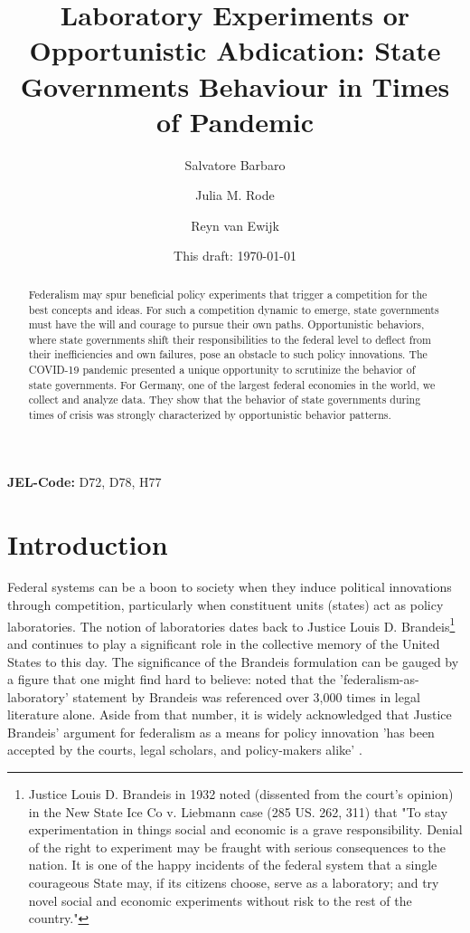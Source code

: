 \documentclass[12pt, abstracton]{scrartcl}
\title{Laboratory Experiments or Opportunistic Abdication: State Governments Behaviour in Times of Pandemic}
\author[$\star$]{Salvatore Barbaro}
\author[$\mp$]{Julia M. Rode}
\author[$ \dag$]{Reyn van Ewijk}
\affil[$\star$,$\dag$]{Johannes-Gutenberg University, Gutenberg School of Management and Economics and Interdisciplinary Public Policy \\ 55122 Mainz, Germany \href{mailto:sbarbaro@uni-mainz.de}{sbarbaro@uni-mainz.de}}
\affil[$\mp$]{Deutsche Bundesbank, 60431 Frankfurt (HE), Germany}
\date{This draft: \today}
\begin{document}
\maketitle

\begin{abstract}
Federalism may spur beneficial policy experiments that trigger a competition for the best concepts and ideas. For such a competition dynamic to emerge, state governments must have the will and courage to pursue their own paths. Opportunistic behaviors, where state governments shift their responsibilities to the federal level to deflect from their inefficiencies and own failures, pose an obstacle to such policy innovations. The COVID-19 pandemic presented a unique opportunity to scrutinize the behavior of state governments. For Germany, one of the largest federal economies in the world, we collect and analyze data. They show that the behavior of state governments during times of crisis was strongly characterized by opportunistic behavior patterns.
\end{abstract}

\textbf{JEL-Code:} D72, D78,  H77
\linenumbers
\section[Introduction]{Introduction}\label{sec.introduction}
Federal systems can be a boon to society when they induce political innovations through competition, particularly when constituent units (states) act as policy laboratories. The notion of laboratories dates back to Justice Louis D. Brandeis\footnote{
	Justice Louis D. Brandeis in 1932 noted (dissented from the court's opinion) in the New State Ice Co v. Liebmann case (285 US. 262, 311) that "To stay experimentation in things social and economic is a grave responsibility. Denial of the right to experiment may be fraught with serious consequences to the nation. It is one of the happy incidents of the federal system that a single courageous State may, if its citizens choose, serve as a laboratory; and try novel social and economic experiments without risk to the rest of the country."  
} and continues to play a significant role in the collective memory of the United States to this day. The significance of the Brandeis formulation can be gauged by a figure that one might find hard to believe: \cite{Tyler2022} noted that the 'federalism-as-laboratory' statement by Brandeis was referenced over 3,000 times in legal literature alone. Aside from that number, it is widely acknowledged that Justice Brandeis' argument for federalism as a means for policy innovation 'has been accepted by the courts, legal scholars, and policy-makers alike' \citep[p.~49]{InmanRubinfeld2020}.   
\end{document}
